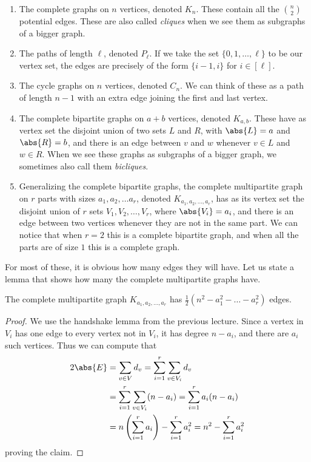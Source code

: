 \documentclass[nobib]{tufte-handout}
\begin{document}
\begin{enumerate}
  \item The complete graphs on $n$ vertices, denoted $K_n$. These contain all the $\binom{n}{2}$ potential edges. These are also called \emph{cliques} when we see them as subgraphs of a bigger graph.
  \item The paths of length $\ell$, denoted $P_\ell$. If we take the set $\{0,1,\ldots,\ell\}$ to be our vertex set, the edges are precisely of the form $\{i-1,i\}$ for $i \in [\ell]$.
  \item The cycle graphs on $n$ vertices, denoted $C_n$. We can think of these as a path of length $n-1$ with an extra edge joining the first and last vertex.
  \item The complete bipartite graphs on $a + b$ vertices, denoted $K_{a,b}$. These have as vertex set the disjoint union of two sets $L$ and $R$, with $\abs{L} = a$ and $\abs{R} = b$, and there is an edge between $v$ and $w$ whenever $v \in L$ and $w \in R$. When we see these graphs as subgraphs of a bigger graph, we sometimes also call them \emph{bicliques}.
  \item Generalizing the complete bipartite graphs, the complete multipartite graph on $r$ parts with sizes $a_1, a_2, \ldots a_r$, denoted $K_{a_1, a_2, \ldots, a_r}$, has as its vertex set the disjoint union of $r$ sets $V_1, V_2, \ldots, V_r$, where $\abs{V_i} = a_i$, and there is an edge between two vertices whenever they are not in the same part. We can notice that when $r=2$ this is a complete bipartite graph, and when all the parts are of size $1$ this is a complete graph.
\end{enumerate}

For most of these, it is obvious how many edges they will have. Let us state a lemma that shows how many the complete multipartite graphs have.

\begin{lemma}
  The complete multipartite graph $K_{a_1, a_2, \ldots, a_r}$ has $\frac{1}{2}\left(n^2 - a_1^2 - \ldots - a_r^2\right)$ edges.

  \begin{proof}
    We use the handshake lemma from the previous lecture. Since a vertex in $V_i$ has one edge to every vertex not in $V_i$, it has degree $n - a_i$, and there are $a_i$ such vertices. Thus we can compute that
    \begin{align*}
      2\abs{E} &= \sum_{v\in V} d_v
      = \sum_{i=1}^r \sum_{v \in V_i} d_v\\
      &= \sum_{i=1}^{r} \sum_{v \in V_i} (n - a_i)
      = \sum_{i=1}^{r} a_i(n - a_i)\\
      &= n\left(\sum_{i=1}^{r} a_i\right) - \sum_{i=1}^{r} a_i^2
      = n^2 - \sum_{i=1}^{r} a_i^2
    \end{align*}
    proving the claim.
  \end{proof}
\end{lemma}
\end{document}
